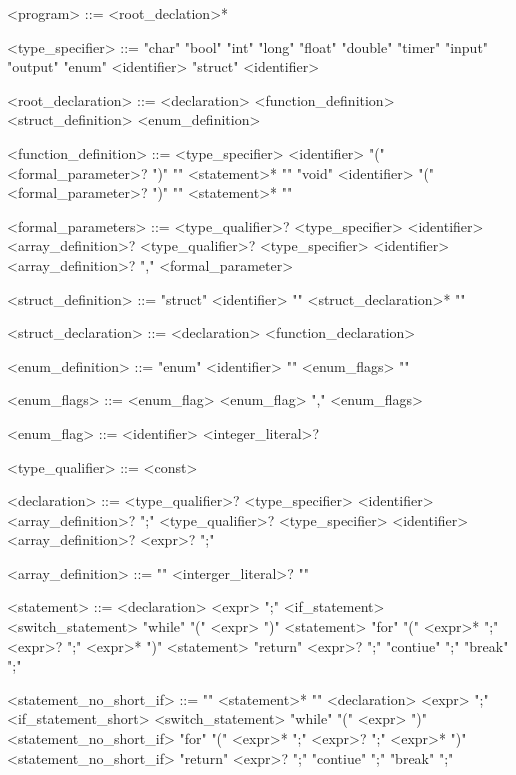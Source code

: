 \begin{grammar}
 
 
 
 
 <program> ::= <root\_declation>*
 
 <type\_specifier> ::= "char"
 \alt "bool"
 \alt "int"
 \alt "long"
 \alt "float"
 \alt "double"
 \alt "timer"
 \alt "input"
 \alt "output"
 \alt "enum" <identifier>
 \alt "struct" <identifier>
 
 <root\_declaration> ::= <declaration>
 \alt <function\_definition>
 \alt <struct\_definition>
 \alt <enum\_definition>
 
 <function\_definition> ::= <type\_specifier> <identifier> "(" <formal\_parameter>? ")" "{" <statement>* "}"
 \alt "void" <identifier> "(" <formal\_parameter>? ")" "{" <statement>* "}"
 
 <formal\_parameters> ::= <type\_qualifier>? <type\_specifier> <identifier> <array\_definition>?
 \alt <type\_qualifier>? <type\_specifier> <identifier> <array\_definition>? "," <formal\_parameter>
 
 <struct\_definition> ::= "struct" <identifier> "{" <struct\_declaration>* "}"
 
 <struct\_declaration> ::= <declaration>
 \alt <function\_declaration>
 
 <enum\_definition> ::= "enum" <identifier> "{" <enum\_flags> "}"
 
 <enum\_flags> ::= <enum\_flag>
 \alt <enum\_flag> "," <enum\_flags>
 
 <enum\_flag> ::= <identifier> <integer\_literal>?
 
 <type\_qualifier> ::= <const>
 
 <declaration> ::= <type\_qualifier>? <type\_specifier> <identifier> <array\_definition>? ";"
 \alt <type\_qualifier>? <type\_specifier> <identifier> <array\_definition>? <expr>? ";"
 
 <array\_definition> ::= "{" <interger\_literal>? "}"
 
 <statement> ::= <declaration>
 \alt <expr> ";"
 \alt <if\_statement>
 \alt <switch\_statement>
 \alt "while" "(" <expr> ")" <statement>
 \alt "for" "(" <expr>* ";" <expr>? ";" <expr>* ")" <statement>
 \alt "return" <expr>? ";"
 \alt "contiue" ";"
 \alt "break" ";"
 
 <statement\_no\_short\_if> ::= "{" <statement>* "}"
 \alt <declaration>
 \alt <expr> ";"
 \alt <if\_statement\_short>
 \alt <switch\_statement>
 \alt "while" "(" <expr> ")" <statement\_no\_short\_if>
 \alt "for" "(" <expr>* ";" <expr>? ";" <expr>* ")" <statement\_no\_short\_if>
 \alt "return" <expr>? ";"
 \alt "contiue" ";"
 \alt "break" ";"
 

\end{grammar}
